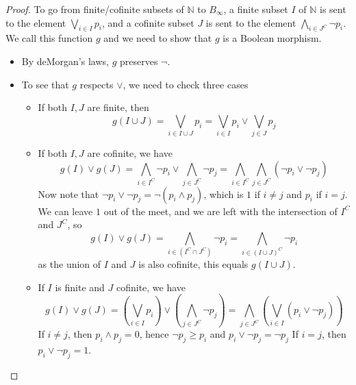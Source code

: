 \begin{proof}
  To go from finite/cofinite subsets of $\mathbb N$ to $B_\infty$,
  a finite subset $I$ of $\mathbb N$ is sent to the element 
  $\bigvee_{i \in I} p_i$, and a cofinite subset $J$ is sent to the element 
  $\bigwedge_{i \in J^C} \neg p_i$.  
  We call this function $g$ and we need to show that $g$ is a Boolean morphism. 
  \begin{itemize}
    \item By deMorgan's laws, $g$ preserves $\neg$. 
    \item To see that $g$ respects $\vee$, we need to check three cases
      \begin{itemize}
        \item If both $I,J$ are finite, then 
        \begin{equation} 
          g(I \cup J) = \bigvee_{i\in I \cup J} p_i= \bigvee_{i\in I} p_i \vee \bigvee_{j\in J} p_j 
        \end{equation}
      \item If both $I,J$ are cofinite, we have
        \begin{equation}
          g(I) \vee g(J) = 
          \bigwedge_{i \in I^C} \neg p_i \vee 
          \bigwedge_{j \in J^C} \neg p_j 
          = 
          \bigwedge_{i\in I^C} 
          \bigwedge_{j \in J^C}(\neg p_i \vee  \neg p_j) 
        \end{equation}
        Now note that $\neg p_i \vee \neg p_j = \neg ( p_i \wedge p_j)$, which 
        is $1$ if $i \neq j$ and $p_i$ if $i =j$. 
        We can leave $1$ out of the meet, and we are left with the intersection of $I^C$ and $J^C$, so
        \begin{equation}
          g(I) \vee g(J) = 
          \bigwedge_{i \in (I^C \cap J^C)} \neg p_i
          = 
          \bigwedge_{i \in (I \cup J)^C} \neg p_i 
        \end{equation} 
        as the union of $I$ and $J$ is also cofinite, this equals 
          $ g( I \cup J)$. 
        \item If $I$ is finite and $J$ cofinite, we have 
        \begin{equation}
        g(I) \vee g(J) = (\bigvee_{i\in I} p_i) \vee (\bigwedge_{j \in J^C} \neg p_j)
        = \bigwedge_{j \in J^C} (\bigvee_{i \in I}( p_i \vee \neg p_j))
        \end{equation}
        If $i\neq j$, then $p_i\wedge p_j = 0$, hence $\neg p_j \geq p_i$ and $p_i \vee \neg p_j  = \neg p_j$
        If $i = j$, then $p_i \vee \neg p_j = 1$.

\end{itemize}
\end{itemize}
\end{proof}
